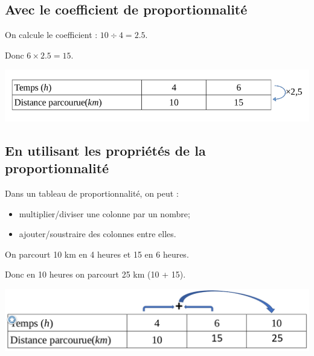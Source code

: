 \documentclass[xcolor={dvipsnames}]{beamer}
\begin{document}
\subsection{Avec le coefficient de proportionnalité}


\begin{frame}
	
	On calcule le coefficient : \pause $10 \div 4 = \num{2.5} $. \pause
	
	Donc  $6 \times \num{2.5} = 15$. \pause
	
	
	\begin{center}
		\includegraphics[scale=0.5]{tab3_3}
	\end{center}
	
\end{frame}

\subsection{En utilisant les propriétés de la proportionnalité}

\begin{frame}
	

\begin{myprop}
	
	Dans un tableau de proportionnalité, on peut : \pause
	\begin{itemize}
		\item multiplier/diviser une colonne par un nombre; \pause 
		\item ajouter/soustraire des colonnes entre elles. \pause
	\end{itemize}	
	
	
\end{myprop}

\vspace*{.75cm}

On parcourt 10 km en 4 heures et 15 en 6 heures. \pause

Donc en 10 heures on parcourt 25 km (10 + 15).\pause

\vspace*{.75cm}

\begin{center}
	\includegraphics[scale=0.35]{tab3_4}
\end{center}

\end{frame}
\end{document}
